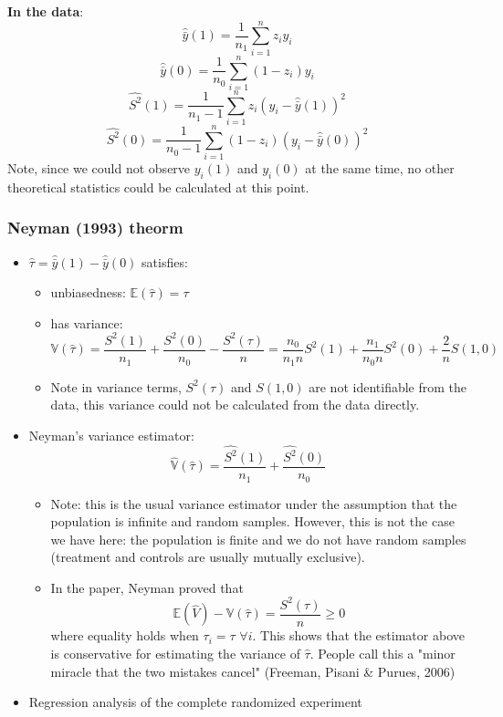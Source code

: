 \textbf{In the data}:
$$\hat{\bar{y}}(1) = \frac{1}{n_1}\sum_{i = 1}^{n}z_{i}y_{i}$$
$$\hat{\bar{y}}(0) = \frac{1}{n_0}\sum_{i = 1}^{n}(1 - z_{i})y_{i}$$
$$\hat{S^{2}}(1) = \frac{1}{n_1 - 1}\sum_{i = 1}^{n}z_i(y_i - \hat{\bar{y}}(1))^{2}$$
$$\hat{S^{2}}(0) = \frac{1}{n_0 - 1}\sum_{i = 1}^{n}(1 - z_i)(y_i - \hat{\bar{y}}(0))^{2}$$
Note, since we could not observe $y_i(1)$ and $y_i(0)$ at the same time, no other theoretical statistics could be calculated at this point.

\subsubsection{Neyman (1993) theorm}
\begin{itemize}
    \item $\hat{\tau} = \hat{\bar{y}}(1) - \hat{\bar{y}}(0)$ satisfies:
    \begin{itemize}
        \item unbiasedness: $\mathbb{E}(\hat{\tau}) = \tau$
        \item has variance: $$\mathbb{V}(\hat{\tau}) = \frac{S^{2}(1)}{n_1} + \frac{S^{2}(0)}{n_0} - \frac{S^{2}(\tau)}{n} = \frac{n_0}{n_{1}n}S^{2}(1) + \frac{n_1}{n_{0}n}S^{2}(0) + \frac{2}{n}S(1, 0)$$
        \item Note in variance terms, $S^{2}(\tau)$ and $S(1, 0)$ are not identifiable from the data, this variance could not be calculated from the data directly.
    \end{itemize}
    \item Neyman's variance estimator: $$\hat{\mathbb{V}}(\hat{\tau}) = \frac{\hat{S^{2}}(1)}{n_1} + \frac{\hat{S^{2}}(0)}{n_0}$$
    \begin{itemize}
        \item Note: this is the usual variance estimator under the assumption that the population is infinite and random samples. However, this is not the case we have here: the population is finite and we do not have random samples (treatment and controls are usually mutually exclusive).
        \item In the paper, Neyman proved that $$\mathbb{E}(\hat{V}) - \mathbb{V}(\hat{\tau}) = \frac{S^{2}(\tau)}{n} \ge 0$$ where equality holds when $\tau_{i} = \tau $ $\forall i$. This shows that the estimator above is conservative for estimating the variance of $\hat{\tau}$. People call this a "minor miracle that the two mistakes cancel" (Freeman, Pisani \& Purues, 2006)
    \end{itemize}
    \item Regression analysis of the complete randomized experiment \\

\end{itemize}
